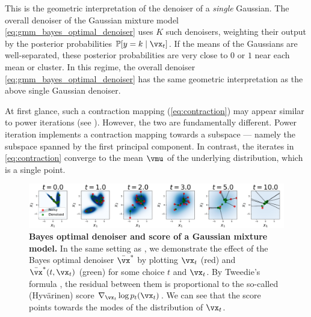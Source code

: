 \documentclass[../../book-main.tex]{subfiles}
\begin{document}
\begin{example}
	This is the geometric interpretation of the denoiser of a \textit{single} Gaussian. The overall denoiser of the Gaussian mixture model \eqref{eq:gmm_bayes_optimal_denoiser} uses \(K\) such denoisers, weighting their output by the posterior probabilities \(\Pr[y = k \mid \vx_{t}]\). If the means of the Gaussians are well-separated, these posterior probabilities are very close to \(0\) or \(1\) near each mean or cluster. In this regime, the overall denoiser \eqref{eq:gmm_bayes_optimal_denoiser} has the same geometric interpretation as the above single Gaussian denoiser.

    At first glance, such a contraction mapping (\eqref{eq:contraction}) may appear similar to power iterations (see ).  However, the two are fundamentally different. Power iteration implements a contraction mapping towards a subspace --- namely the subspace spanned by the first principal component. In contrast, the iterates in \eqref{eq:contraction} converge to the mean \(\vmu\) of the underlying distribution, which is a single point.  
\end{example}

\begin{figure}
	\centering 
	\includegraphics[width=\textwidth]{chapters/chapter3/figs/ve_forward_diffusion_denoising.png}\vspace{-0.15in}
	\caption{\small \textbf{Bayes optimal denoiser and score of a Gaussian mixture model.} In the same setting as , we demonstrate the effect of the Bayes optimal denoiser \(\bar{\vx}^{\ast}\) by plotting \(\vx_{t}\) (red) and \(\bar{\vx}^{\ast}(t, \vx_{t})\) (green) for some choice \(t\) and \(\vx_{t}\). By Tweedie's formula , the residual between them is proportional to the so-called (Hyv\"arinen) score \(\nabla_{\vx_{t}}\log p_{t}(\vx_{t})\). We can see that the score points towards the modes of the distribution of \(\vx_{t}\).}
	\label{fig:ve_forward_denoising}
\end{figure}
\end{document}
